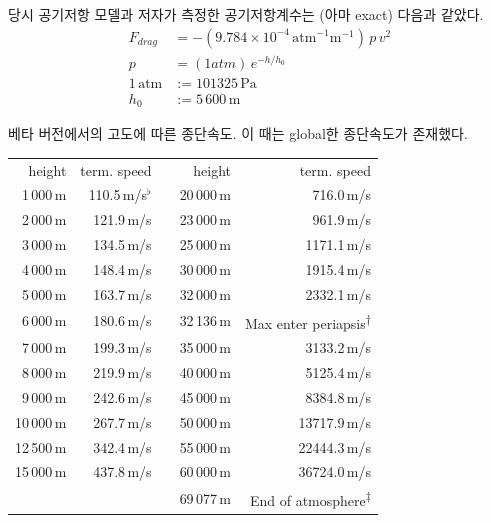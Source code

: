 \documentclass[9pt]{amsbook}
\newcommand{\ttuna}{\textsuperscript{$\dagger$}} %
\newcommand{\ttsecu}{\textsuperscript{$\ddagger$}} %
\begin{document}
당시 공기저항 모델과 저자가 측정한 공기저항계수는 (아마 exact) 다음과 같았다.
\begin{align}
F_{drag}&=-(9.784\times 10^{-4}\, \mathrm{atm}^{-1}\mathrm{m}^{-1})\, p\, v^2
\\p&=(1 atm)\,e^{-h/h_0}
\\1\,\mathrm{atm} &:= 101325\,\mathrm{Pa}
\\h_0&:= 5\,600\,\mathrm{m}
\end{align}
\begin{center}
\begin{threeparttable}
	\caption{베타 버전에서의 고도에 따른 종단속도. 이 때는 global한 종단속도가 존재했다.}
		\begin{tabular}{|r|r|r|r|r|}
			\cline{1-2}\cline{4-5}
			height& term. speed&&height& term. speed
			\\\cline{1-2}\cline{4-5}
			1\,000\,m&110.5\,m/s$^\flat$ && 20\,000\,m&716.0\,m/s
			\\\cline{1-2}\cline{4-5}
			2\,000\,m&121.9\,m/s && 23\,000\,{m}&961.9\,m/s
			\\\cline{1-2}\cline{4-5}
			3\,000\,m&134.5\,m/s && 25\,000\,{m}&1171.1\,m/s
			\\\cline{1-2}\cline{4-5}
			4\,000\,m&148.4\,m/s && 30\,000\,{m}&1915.4\,m/s
			\\\cline{1-2}\cline{4-5}
			5\,000\,m&163.7\,m/s && 32\,000\,{m}&2332.1\,m/s
			\\\cline{1-2}\cline{4-5}
			6\,000\,{m}&180.6\,m/s && 32\,136\,{m}&Max enter periapsis\ttuna
			\\\cline{1-2}\cline{4-5}
			7\,000\,{m}&199.3\,m/s && 35\,000\,{m}&3133.2\,m/s
			\\\cline{1-2}\cline{4-5}
			8\,000\,{m}&219.9\,m/s && 40\,000\,{m}&5125.4\,m/s
			\\\cline{1-2}\cline{4-5}
			9\,000\,{m}&242.6\,m/s && 45\,000\,{m}&8384.8\,m/s
			\\\cline{1-2}\cline{4-5}
			10\,000\,{m}&267.7\,m/s && 50\,000\,{m}&13717.9\,m/s
			\\\cline{1-2}\cline{4-5}
			12\,500\,{m}&342.4\,m/s && 55\,000\,{m}&22444.3\,m/s
			\\\cline{1-2}\cline{4-5}
			15\,000\,{m}&437.8\,m/s && 60\,000\,{m}&36724.0\,m/s
			\\\cline{1-2}\cline{4-5}
			\multicolumn{3}{r|}{}&69\,077\,{m}&End of atmosphere\ttsecu
			\\\cline{4-5}
		\end{tabular}
	\begin{tablenotes}

\end{tablenotes}
\end{threeparttable}
\end{center}
\end{document}
